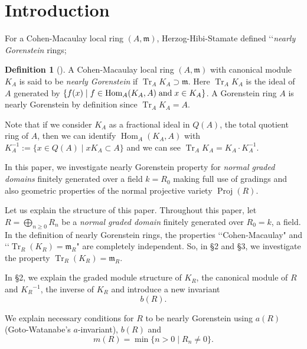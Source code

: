 \documentclass[12pt]{amsart}
\theoremstyle{definition}
\newtheorem{defn}[thm]{Definition}
\theoremstyle{remark}
\numberwithin{equation}{section}
\DeclareMathOperator{\Proj}{Proj}
\DeclareMathOperator{\Hom}{Hom}
\DeclareMathOperator{\tr}{Tr}
\DeclareMathOperator{\Tr}{Tr}
\newcommand{\m}{\mathfrak m}
\newcommand{\KiR}{{K_R}^{-1}}
\renewcommand{\:}{\colon}
\begin{document}
\maketitle

\section{Introduction}
\label{s:Intro}

For a Cohen-Macaulay local ring $(A,\m)$, Herzog-Hibi-Stamate 
defined \lq\lq {\em nearly Gorenstein} rings;   

\begin{defn}[{\cite[2.2]{HHS}}]
A Cohen-Macaulay local ring $(A,\m)$ with canonical module $K_A$ is 
said to be {\em nearly Gorenstein} 
if $\tr_A K_A \supset \m$. Here $\Tr_A K_A$ is the ideal 
 of $A$ generated by 
$\{ f(x)\;|\; f\in \Hom_A(K_A,A) \;{\rm and}\; x\in K_A\}$.
A Gorenstein ring $A$ is nearly Gorenstein by definition 
since $\Tr_A K_A =A$.  
\end{defn}

\par 
Note that if we consider $K_A$ as a fractional ideal in $Q(A)$, 
the total quotient ring of $A$, 
then we can identify $\Hom_A(K_A,A)$ with 
$K_A^{-1}:= \{ x\in Q(A)\;|\; xK_A\subset A\}$ 
and we can see $\Tr_A K_A = K_A\cdot K_A^{-1}$.   

\par 
In this paper, we investigate nearly Gorenstein property for 
 {\em normal graded domains}
finitely generated over a field $k=R_0$ 
making full use of gradings and also geometric properties
of the normal projective variety $\Proj(R)$. 
\bigskip
\par
Let us explain the structure of this paper. 
Throughout this paper, let 
$R = \bigoplus_{n\ge  0} R_n$ be a 
{\em normal graded domain} finitely generated over $R_0=k$,  a field. 
In the definition of nearly Gorenstein rings, 
the properties    \lq\lq Cohen-Macaulay" and 
\lq\lq $\Tr_R(K_R)=\m_R$" are completely independent.  
So, in \S 2 and \S 3, we investigate the property $\Tr_R(K_R)=\m_R$. 


\par 
In \S 2, we explain the graded module structure of $K_R$, the canonical module of $R$ and 
$\KiR$, the inverse of  $K_R$ and introduce a new invariant 
\[
b(R).
\]


\par 
We explain necessary conditions for $R$ to be nearly Gorenstein using $a(R)$ (Goto-Watanabe's 
$a$-invariant), $b(R)$ and 
\[
m(R) = \min\{ n>0\;|\; R_n \ne 0\}.
\] 
\end{document}
